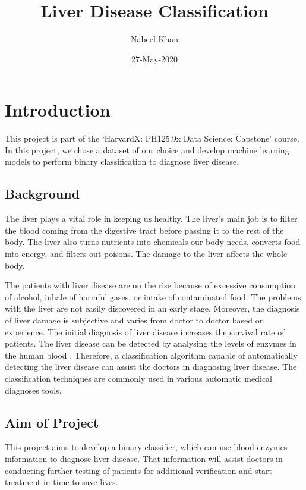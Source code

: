\documentclass[]{article}
\title{Liver Disease Classification}
\author{Nabeel Khan}
\date{27-May-2020}
\begin{document}
\maketitle

{
\setcounter{tocdepth}{2}
\tableofcontents
}
\section{Introduction}
\label{sec:introduction}

This project is part of the `HarvardX: PH125.9x Data Science: Capstone'
course. In this project, we chose a dataset of our choice and develop
machine learning models to perform binary classification to diagnose
liver disease.

\subsection{Background}
\label{sec:background}

The liver plays a vital role in keeping us healthy. The liver's main job
is to filter the blood coming from the digestive tract before passing it
to the rest of the body. The liver also turns nutrients into chemicals
our body needs, converts food into energy, and filters out poisons. The
damage to the liver affects the whole body.

The patients with liver disease are on the rise because of excessive
consumption of alcohol, inhale of harmful gases, or intake of
contaminated food. The problems with the liver are not easily discovered
in an early stage. Moreover, the diagnosis of liver damage is subjective
and varies from doctor to doctor based on experience. The initial
diagnosis of liver disease increases the survival rate of patients. The
liver disease can be detected by analysing the levels of enzymes in the
human blood \cite{ld,bendi}. Therefore, a classification algorithm
capable of automatically detecting the liver disease can assist the
doctors in diagnosing liver disease. The classification techniques are
commonly used in various automatic medical diagnoses tools\cite{cad}.

\subsection{Aim of Project}
\label{sec:aim}

This project aims to develop a binary classifier, which can use blood
enzymes information to diagnose liver disease. That information will
assist doctors in conducting further testing of patients for additional
verification and start treatment in time to save lives.
\end{document}
